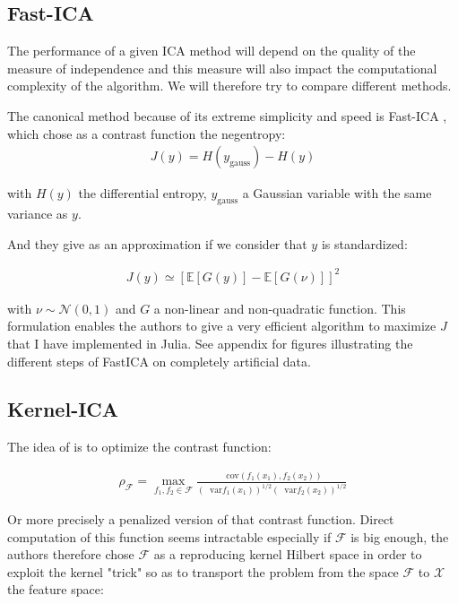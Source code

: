 \documentclass[11pt]{article}
\newcommand*\cov{\mathop{}\!\mathrm{cov}}
\newcommand*\var{\mathop{}\!\mathrm{var}}
\begin{document}
\subsection{Fast-ICA}

The performance of a given ICA method will depend on the quality of the measure of independence and this measure will also impact the computational complexity of the algorithm. We will therefore try to compare different methods.

The canonical method because of its extreme simplicity and speed is Fast-ICA \cite{Hyvarinen2000}, which chose as a contrast function the negentropy:
\begin{align*}
	J(y) = H(y_\text{gauss}) - H(y)
\end{align*}

with $H(y)$ the differential entropy, $y_\text{gauss}$ a Gaussian variable with the same variance as $y$.

And they give as an approximation if we consider that $y$ is standardized:

\begin{align*}
	J(y) \simeq \left[ \mathbb{E} \left[ G(y) \right] - \mathbb{E} \left[ G(\nu) \right] \right]^2
\end{align*}

with $\nu \sim \mathcal{N} (0,1)$ and $G$ a non-linear and non-quadratic function. This formulation enables the authors to give a very efficient algorithm to maximize $J$ that I have implemented in Julia. See appendix for figures illustrating the different steps of FastICA on completely artificial data.

\subsection{Kernel-ICA}

The idea of \cite{Bach2002} is to optimize the contrast function:

\begin{align*}
	\rho_{\mathcal{F}} = \max_{f_1, f_2 \in \mathcal{F}} \frac{\cov(f_1 (x_1), f_2(x_2))}{(\var f_1(x_1))^{1/2} (\var f_2(x_2))^{1/2}}
\end{align*}

Or more precisely a penalized version of that contrast function. Direct computation of this function seems intractable especially if $\mathcal{F}$ is big enough, the authors therefore chose $\mathcal{F}$ as a reproducing kernel Hilbert space in order to exploit the kernel "trick" so as to transport the problem from the space $\mathcal{F}$ to $\mathcal{X}$ the feature space:
\end{document}
